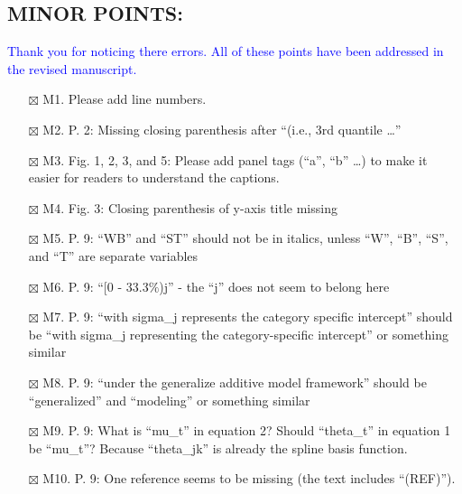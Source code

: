 \documentclass[
]{article}
\begin{document}
\hypertarget{minor-points}{%
\subsection{MINOR POINTS:}\label{minor-points}}

\textcolor{blue}{Thank you for noticing there errors. All of these points have been addressed in the revised manuscript.}

\begin{itemize}
\item[$\boxtimes$]
  M1. Please add line numbers.
\item[$\boxtimes$]
  M2. P. 2: Missing closing parenthesis after ``(i.e., 3rd quantile
  \ldots{}''
\item[$\boxtimes$]
  M3. Fig. 1, 2, 3, and 5: Please add panel tags (``a'', ``b'' \ldots)
  to make it easier for readers to understand the captions.
\item[$\boxtimes$]
  M4. Fig. 3: Closing parenthesis of y-axis title missing
\item[$\boxtimes$]
  M5. P. 9: ``WB'' and ``ST'' should not be in italics, unless ``W'',
  ``B'', ``S'', and ``T'' are separate variables
\item[$\boxtimes$]
  M6. P. 9: ``{[}0 - 33.3\(\%\))j'' - the ``j'' does not seem to belong
  here
\item[$\boxtimes$]
  M7. P. 9: ``with sigma\_j represents the category specific intercept''
  should be ``with sigma\_j representing the category-specific
  intercept'' or something similar
\item[$\boxtimes$]
  M8. P. 9: ``under the generalize additive model framework'' should be
  ``generalized'' and ``modeling'' or something similar
\item[$\boxtimes$]
  M9. P. 9: What is ``mu\_t'' in equation 2? Should ``theta\_t'' in
  equation 1 be ``mu\_t''? Because ``theta\_jk'' is already the spline
  basis function.
\item[$\boxtimes$]
  M10. P. 9: One reference seems to be missing (the text includes
  ``(REF)'').
\end{itemize}
\end{document}
